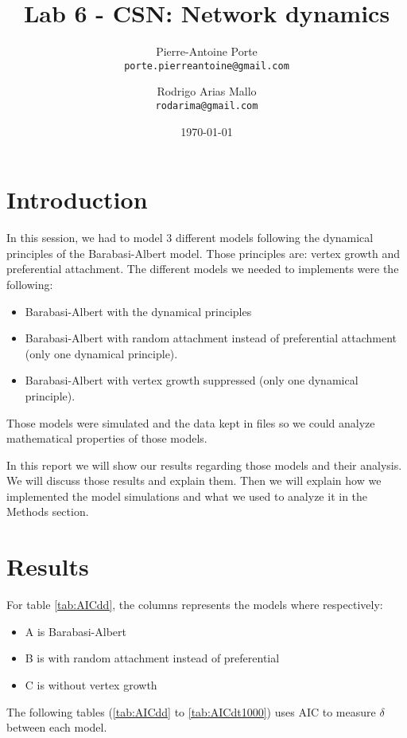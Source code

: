 \documentclass{article}
\title{Lab 6 - CSN: Network dynamics}
\author{Pierre-Antoine Porte \\ \texttt{porte.pierreantoine@gmail.com}
\and Rodrigo Arias Mallo \\ \texttt{rodarima@gmail.com}}
\date{\today}
\begin{document}
\maketitle

\section{Introduction}

In this session, we had to model 3 different models following the dynamical
principles of the Barabasi-Albert model. Those principles are: vertex growth and
preferential attachment. The different models we needed to implements were the
following:

\begin{itemize}
	\item Barabasi-Albert with the dynamical principles
	\item Barabasi-Albert with random attachment instead of preferential
	attachment (only one dynamical principle).
	\item Barabasi-Albert with vertex growth suppressed (only one dynamical
	principle).
\end{itemize}

Those models were simulated and the data kept in files so we could analyze
mathematical properties of those models.

In this report we will show our results regarding those models and their
analysis. We will discuss those results and explain them. Then we will explain
how we implemented the model simulations and what we used to analyze it in the
Methods section.

\section{Results}

For table \ref{tab:AICdd}, the columns represents the models where respectively:

\begin{itemize}
		\item A is Barabasi-Albert
		\item B is with random attachment instead of preferential
		\item C is without vertex growth
\end{itemize}

The following tables (\ref{tab:AICdd} to \ref{tab:AICdt1000}) uses AIC to
measure $\delta$ between each model.

\end{document}
